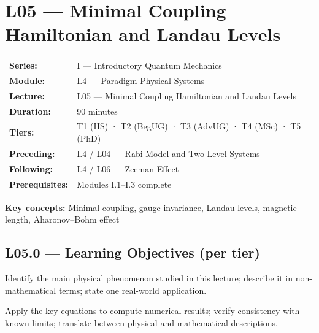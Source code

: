 \renewcommand{\lectureCode}{I.4 / L05}

\section*{L05 — Minimal Coupling Hamiltonian and Landau Levels}
\label{sec:L05}

\begin{tcolorbox}[lecturebox, title={Module I.4 / L05 — Metadata}]
\begin{tabular}{@{}ll@{}}
\textbf{Series:}    & I — Introductory Quantum Mechanics \\
\textbf{Module:}    & I.4 — Paradigm Physical Systems \\
\textbf{Lecture:}   & L05 — Minimal Coupling Hamiltonian and Landau Levels \\
\textbf{Duration:}  & 90 minutes \\
\textbf{Tiers:}     & T1 (HS) · T2 (BegUG) · T3 (AdvUG) · T4 (MSc) · T5 (PhD) \\
\textbf{Preceding:} & I.4 / L04 — Rabi Model and Two-Level Systems \\
\textbf{Following:} & I.4 / L06 — Zeeman Effect \\
\textbf{Prerequisites:} & Modules I.1–I.3 complete \\
\end{tabular}

\medskip
\textbf{Key concepts:} Minimal coupling, gauge invariance, Landau levels, magnetic length, Aharonov–Bohm effect
\end{tcolorbox}

\subsection*{L05.0 — Learning Objectives (per tier)}
\label{sec:L05.0}

\quad
Identify the main physical phenomenon studied in this lecture; describe it in
non-mathematical terms; state one real-world application.

\quad
Apply the key equations to compute numerical results; verify consistency with
known limits; translate between physical and mathematical descriptions.

